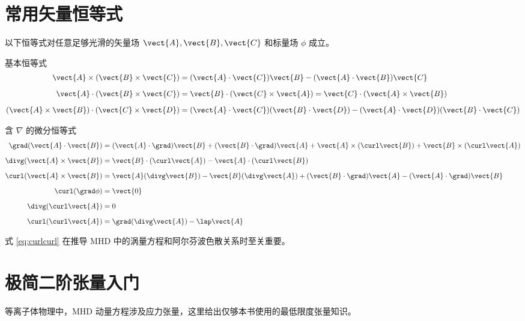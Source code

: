 \section{常用矢量恒等式}

以下恒等式对任意足够光滑的矢量场 $\vect{A},\vect{B},\vect{C}$ 和标量场 $\phi$ 成立。

\begin{theorem}{基本恒等式}{}
\begin{align}
\vect{A}\times(\vect{B}\times\vect{C}) &= (\vect{A}\cdot\vect{C})\vect{B} - (\vect{A}\cdot\vect{B})\vect{C} \label{eq:bac-cab} \\[6pt]
\vect{A}\cdot(\vect{B}\times\vect{C}) &= \vect{B}\cdot(\vect{C}\times\vect{A}) = \vect{C}\cdot(\vect{A}\times\vect{B}) \\[6pt]
(\vect{A}\times\vect{B})\cdot(\vect{C}\times\vect{D}) &= (\vect{A}\cdot\vect{C})(\vect{B}\cdot\vect{D}) - (\vect{A}\cdot\vect{D})(\vect{B}\cdot\vect{C})
\end{align}
\end{theorem}

\begin{theorem}{含 $\nabla$ 的微分恒等式}{}
\begin{align}
\grad(\vect{A}\cdot\vect{B}) &= (\vect{A}\cdot\grad)\vect{B} + (\vect{B}\cdot\grad)\vect{A} + \vect{A}\times(\curl\vect{B}) + \vect{B}\times(\curl\vect{A}) \\[6pt]
\divg(\vect{A}\times\vect{B}) &= \vect{B}\cdot(\curl\vect{A}) - \vect{A}\cdot(\curl\vect{B}) \\[6pt]
\curl(\vect{A}\times\vect{B}) &= \vect{A}(\divg\vect{B}) - \vect{B}(\divg\vect{A}) + (\vect{B}\cdot\grad)\vect{A} - (\vect{A}\cdot\grad)\vect{B} \\[6pt]
\curl(\grad\phi) &= \vect{0} \\[6pt]
\divg(\curl\vect{A}) &= 0 \\[6pt]
\curl(\curl\vect{A}) &= \grad(\divg\vect{A}) - \lap\vect{A} \label{eq:curlcurl}
\end{align}
\end{theorem}

式 \eqref{eq:curlcurl} 在推导 MHD 中的涡量方程和阿尔芬波色散关系时至关重要。


\section{极简二阶张量入门}

等离子体物理中，MHD 动量方程涉及应力张量，这里给出仅够本书使用的最低限度张量知识。

